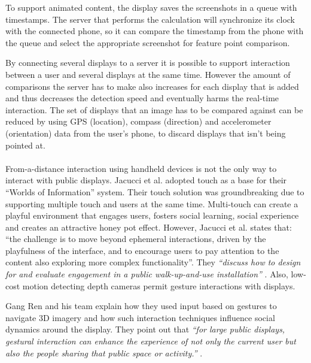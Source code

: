 To support animated content, the display saves the screenshots in a queue with timestamps. The server that performs the calculation will synchronize its clock with the connected phone, so it can compare the timestamp from the phone with the queue and select the appropriate screenshot for feature point comparison.

By connecting several displays  to a server it is possible to support interaction between a user and several displays at the same time. However the amount of comparisons the server has to make also increases for each display that is added and thus decreases the detection speed and eventually harms the real-time interaction. The set of displays that an image has to be compared against can be reduced by using GPS (location), compass (direction) and accelerometer (orientation) data from the user's phone, to discard displays that isn't being pointed at. %
\\\\
From-a-distance interaction using handheld devices is not the only way to interact with public displays. %
Jacucci et al. adopted touch as a base for their ``Worlds of Information'' system. Their touch solution was groundbreaking due to supporting multiple touch and users at the same time. Multi-touch can create a playful environment that engages users, fosters social learning, social experience and creates an attractive honey pot effect. However, Jacucci et al. states that: ``the challenge is to move beyond ephemeral interactions, driven by the playfulness of 
the interface, and to encourage users to pay attention to the content also exploring more complex functionality''\cite{Jacucci:2010}.
They \emph{``discuss how to design for and evaluate engagement in a public walk-up-and-use installation''} \cite{Jacucci:2010}. %
Also, low-cost motion detecting depth cameras permit gesture interactions with displays. 


Gang Ren and his team explain how they used input based on gestures to navigate 3D imagery and how such interaction techniques influence social dynamics around the display. 
They point out that\emph{ ``for large public displays, gestural interaction can enhance the experience of not only the current user but also the people sharing that public space or activity.''} \cite{Ren:2013}.\\

